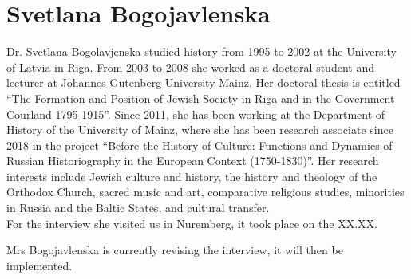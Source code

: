 \section{Svetlana Bogojavlenska}

Dr. Svetlana Bogolavjenska studied history from 1995 to 2002 at the University of Latvia in Riga. From 2003 to 2008 she worked as a doctoral student and lecturer at Johannes Gutenberg University Mainz. Her doctoral thesis is entitled "`The Formation and Position of Jewish Society in Riga and in the Government Courland 1795-1915"'. Since 2011, she has been working at the Department of History of the University of Mainz, where she has been research associate since 2018 in the project "`Before the History of Culture: Functions and Dynamics of Russian Historiography in the European Context (1750-1830)"'. Her research interests include Jewish culture and history, the history and theology of the Orthodox Church, sacred music and art, comparative religious studies, minorities in Russia and the Baltic States, and cultural transfer. \\
For the interview she visited us in Nuremberg, it took place on the XX.XX. 

Mrs Bogojavlenska is currently revising the interview, it will then be implemented.